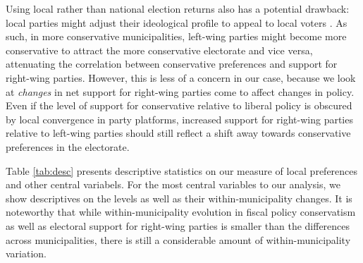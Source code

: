 \documentclass[a4paper,12pt]{article}
\begin{document}
Using local rather than national election returns also has a potential drawback: local parties might adjust their ideological profile to appeal to local voters \citep{erikson1993statehouse}. As such, in more conservative municipalities, left-wing parties might become more conservative to attract the more conservative electorate and vice versa, attenuating the correlation between conservative preferences and support for right-wing parties. However, this is less of a concern in our case, because we look at \textit{changes} in net support for right-wing parties come to affect changes in policy. Even if the level of support for conservative relative to liberal policy is obscured by local convergence in party platforms, increased support for right-wing parties relative to left-wing parties should still reflect a shift away towards conservative preferences in the electorate.

Table \ref{tab:desc} presents descriptive statistics on our measure of local preferences and other central variabels. For the most central variables to our analysis, we show descriptives on the levels as well as their within-municipality changes. It is noteworthy that while within-municipality evolution in fiscal policy conservatism as well as electoral support for right-wing parties is smaller than the differences across municipalities, there is still a considerable amount of within-municipality variation. 
\end{document}
